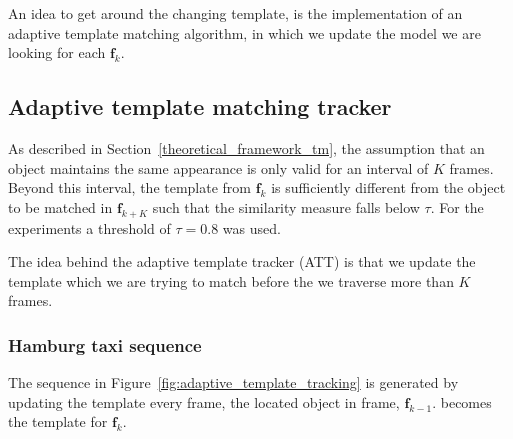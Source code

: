 An idea to get around the changing template, is the implementation of an
adaptive template matching algorithm, in which we update the model we are
looking for each $\mathbf{f}_k$.

\subsection{Adaptive template matching tracker}\label{results_adaptive_template_matching}
As described in Section~\ref{theoretical_framework_tm}, the assumption
that an object maintains the same appearance is only valid for an interval of
$K$ frames. Beyond this interval, the template from $\mathbf{f}_{k}$ is sufficiently different
from the object to be matched in $\mathbf{f}_{k+K}$ such that the similarity
measure falls below $\tau$. For the experiments a threshold of $\tau=0.8$ was used.

The idea behind the adaptive template tracker (ATT) is that we update the
template which we are trying to match before the we traverse more than
$K$ frames.

\subsubsection{Hamburg taxi sequence}
The sequence in Figure~\ref{fig:adaptive_template_tracking} is generated by
updating the template every frame, the located object in frame,
$\mathbf{f}_{k-1}$. becomes the template for $\mathbf{f}_k$.

